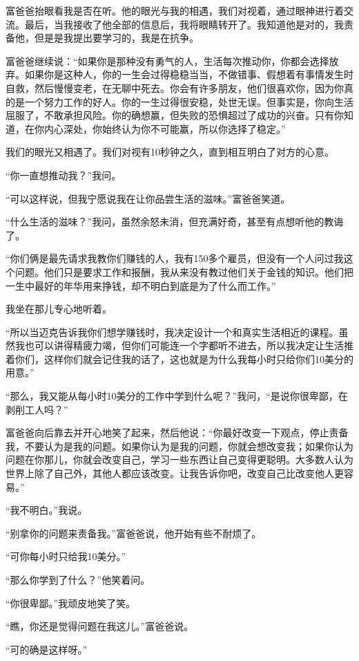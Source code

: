 富爸爸抬眼看我是否在听。他的眼光与我的相遇，我们对视着，通过眼神进行着交流。最后，当我接收了他全部的信息后，我将眼睛转开了。我知道他是对的，我责备他，但是是我提出要学习的，我是在抗争。

富爸爸继续说：“如果你是那种没有勇气的人，生活每次推动你，你都会选择放弃。如果你是这种人，你的一生会过得稳稳当当，不做错事、假想着有事情发生时自救，然后慢慢变老，在无聊中死去。你会有许多朋友，他们很喜欢你，因为你真的是一个努力工作的好人。你的一生过得很安稳，处世无误。但事实是，你向生活屈服了，不敢承担风险。你的确想赢，但失败的恐惧超过了成功的兴奋。只有你知道，在你内心深处，你始终认为你不可能赢，所以你选择了稳定。”

我们的眼光又相遇了。我们对视有10秒钟之久，直到相互明白了对方的心意。

“你一直想推动我？”我问。

“可以这样说，但我宁愿说我在让你品尝生活的滋味。”富爸爸笑道。

“什么生活的滋味？”我问，虽然余怒未消，但充满好奇，甚至有点想听他的教诲了。

“你们俩是最先请求我教你们赚钱的人，我有150多个雇员，但没有一个人问过我这个问题。他们只是要求工作和报酬，我从来没有教过他们关于金钱的知识。他们把一生中最好的年华用来挣钱，却不明白到底是为了什么而工作。”

我坐在那儿专心地听着。

“所以当迈克告诉我你们想学赚钱时，我决定设计一个和真实生活相近的课程。虽然我也可以讲得精疲力竭，但你们可能连一个字都听不进去，所以我决定让生活推着你们，这样你们就会记住我的话了，这也就是为什么我每小时只给你们10美分的用意。”

“那么，我又能从每小时10美分的工作中学到什么呢？”我问，“是说你很卑鄙，在剥削工人吗？”

富爸爸向后靠去并开心地笑了起来，然后他说：“你最好改变一下观点，停止责备我，不要认为是我的问题。如果你认为是我的问题，你就会想改变我；如果你认为问题在你那儿，你就会改变自己，学习一些东西让自己变得更聪明。大多数人认为世界上除了自己外，其他人都应该改变。让我告诉你吧，改变自己比改变他人更容易。”

“我不明白。”我说。

“别拿你的问题来责备我。”富爸爸说，他开始有些不耐烦了。

“可你每小时只给我10美分。”

“那么你学到了什么？”他笑着问。

“你很卑鄙。”我顽皮地笑了笑。

“瞧，你还是觉得问题在我这儿。”富爸爸说。

“可的确是这样呀。”

